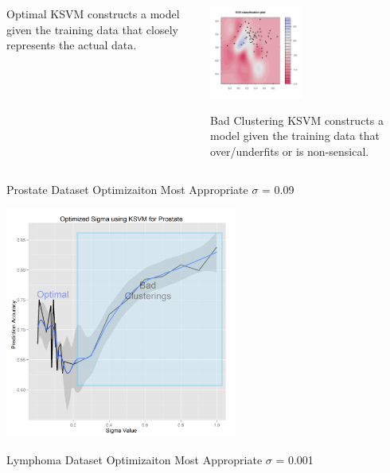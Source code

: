 \documentclass[serif]{beamer}
\begin{document}
\begin{frame}[t]
{\begin{columns}
\begin{column}{2in}
\begin{block}{Optimal}
						KSVM constructs a model given the training data that closely represents the actual data.
					\end{block}
				\end{column}
				\begin{column}{2in}
					\begin{center}
						\includegraphics[height=1.2in]{images/ksvm/bad}	
					\end{center}
					\vspace{-0.2in}
					\begin{block}{Bad Clustering}
						KSVM constructs a model given the training data that over/underfits or is non-sensical.
					\end{block}										
				\end{column}
			\end{columns}
		}
		{
			\begin{center}
				\begin{exampleblock}{Prostate Dataset Optimizaiton}
					Most Appropriate $\sigma$ = 0.09
				\end{exampleblock}
				\includegraphics[width=3.0in]{images/sigma_graphs/sigma_graph_for_Prostate}
			\end{center}
		}
		{
			\begin{center}
				\begin{exampleblock}{Lymphoma Dataset Optimizaiton}
					Most Appropriate $\sigma$ = 0.001
				\end{exampleblock}

\end{center}}
\end{frame}
\end{document}
